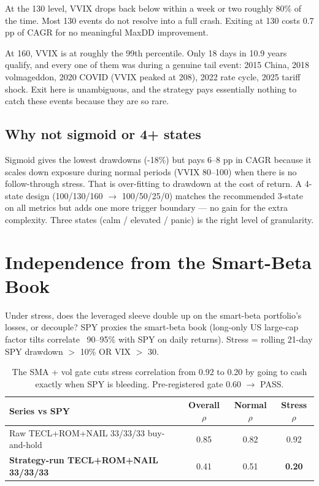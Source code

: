 \documentclass[11pt,a4paper]{article}
\begin{document}
At the 130 level, VVIX drops back below within a week or two roughly 80\% of the time. Most 130 events do not resolve into a full crash. Exiting at 130 costs 0.7 pp of CAGR for no meaningful MaxDD improvement.

At 160, VVIX is at roughly the 99th percentile. Only 18 days in 10.9 years qualify, and every one of them was during a genuine tail event: 2015 China, 2018 volmageddon, 2020 COVID (VVIX peaked at 208), 2022 rate cycle, 2025 tariff shock. Exit here is unambiguous, and the strategy pays essentially nothing to catch these events because they are so rare.

\subsection{Why not sigmoid or 4+ states}

Sigmoid gives the lowest drawdowns (-18\%) but pays 6--8 pp in CAGR because it scales down exposure during normal periods (VVIX 80--100) when there is no follow-through stress. That is over-fitting to drawdown at the cost of return. A 4-state design (100/130/160 $\to$ 100/50/25/0) matches the recommended 3-state on all metrics but adds one more trigger boundary --- no gain for the extra complexity. Three states (calm / elevated / panic) is the right level of granularity.

\section{Independence from the Smart-Beta Book}

Under stress, does the leveraged sleeve double up on the smart-beta portfolio's losses, or decouple? SPY proxies the smart-beta book (long-only US large-cap factor tilts correlate ~90--95\% with SPY on daily returns). Stress = rolling 21-day SPY drawdown $>$ 10\% OR VIX $>$ 30.

\begin{table}[H]
\centering
\small
\begin{tabular}{lccc}
\toprule
\textbf{Series vs SPY} & \textbf{Overall $\rho$} & \textbf{Normal $\rho$} & \textbf{Stress $\rho$} \\
\midrule
Raw TECL+ROM+NAIL 33/33/33 buy-and-hold                & 0.85 & 0.82 & 0.92 \\
\rowcolor{green!10} \textbf{Strategy-run TECL+ROM+NAIL 33/33/33} & 0.41 & 0.51 & \textbf{0.20} \\
\bottomrule
\end{tabular}
\caption{The SMA + vol gate cuts stress correlation from 0.92 to 0.20 by going to cash exactly when SPY is bleeding. Pre-registered gate 0.60 $\to$ PASS.}
\end{table}
\end{document}
